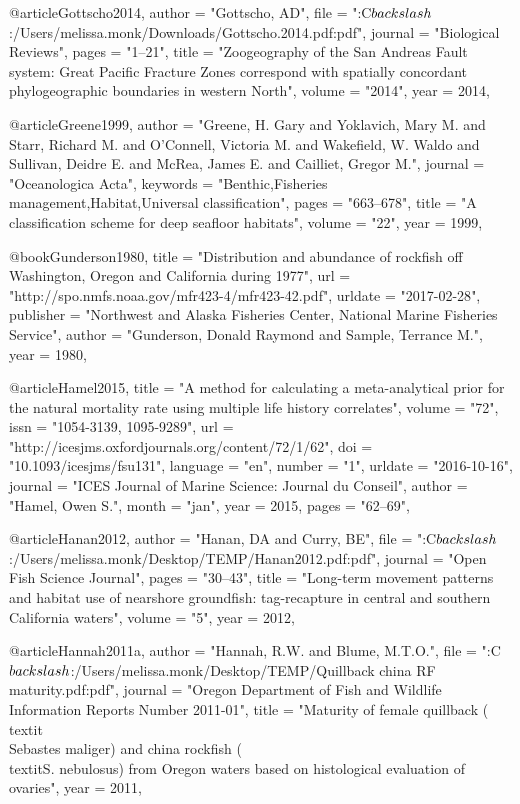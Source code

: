 @article{Gottscho2014,
    author = "{Gottscho, AD}",
    file = "{:C$\\backslash$:/Users/melissa.monk/Downloads/Gottscho.2014.pdf:pdf}",
    journal = "{Biological Reviews}",
    pages = "{1--21}",
    title = "{{Zoogeography of the San Andreas Fault system: Great Pacific Fracture Zones correspond with spatially concordant phylogeographic boundaries in western North}}",
    volume = "{2014}",
    year = 2014,
}

@article{Greene1999,
    author = "{Greene, H. Gary and Yoklavich, Mary M. and Starr, Richard M. and O'Connell, Victoria M. and Wakefield, W. Waldo and Sullivan, Deidre E. and McRea, James E. and Cailliet, Gregor M.}",
    journal = "{Oceanologica Acta}",
    keywords = "{Benthic,Fisheries management,Habitat,Universal classification}",
    pages = "{663--678}",
    title = "{{A classification scheme for deep seafloor habitats}}",
    volume = "{22}",
    year = 1999,
}

@book{Gunderson1980,
    title = "{Distribution and abundance of rockfish off {Washington}, {Oregon} and {California} during 1977}",
    url = "{http://spo.nmfs.noaa.gov/mfr423-4/mfr423-42.pdf}",
    urldate = "{2017-02-28}",
    publisher = "{Northwest and Alaska Fisheries Center, National Marine Fisheries Service}",
    author = "{Gunderson, Donald Raymond and Sample, Terrance M.}",
    year = 1980,
}

@article{Hamel2015,
    title = "{A method for calculating a meta-analytical prior for the natural mortality rate using multiple life history correlates}",
    volume = "{72}",
    issn = "{1054-3139, 1095-9289}",
    url = "{http://icesjms.oxfordjournals.org/content/72/1/62}",
    doi = "{10.1093/icesjms/fsu131}",
    language = "{en}",
    number = "{1}",
    urldate = "{2016-10-16}",
    journal = "{ICES Journal of Marine Science: Journal du Conseil}",
    author = "{Hamel, Owen S.}",
    month = "jan",
    year = 2015,
    pages = "{62--69}",
}

@article{Hanan2012,
    author = "{Hanan, DA and Curry, BE}",
    file = "{:C$\\backslash$:/Users/melissa.monk/Desktop/TEMP/Hanan2012.pdf:pdf}",
    journal = "{Open Fish Science Journal}",
    pages = "{30--43}",
    title = "{{Long-term movement patterns and habitat use of nearshore groundfish: tag-recapture in central and southern California waters}}",
    volume = "{5}",
    year = 2012,
}

@article{Hannah2011a,
    author = "{Hannah, R.W. and Blume, M.T.O.}",
    file = "{:C$\\backslash$:/Users/melissa.monk/Desktop/TEMP/Quillback china RF maturity.pdf:pdf}",
    journal = "{Oregon Department of Fish and Wildlife Information Reports Number 2011-01}",
    title = "{{Maturity of female quillback (\\textit\\{{Sebastes} maliger}) and china rockfish (\\textit{S. nebulosus}) from Oregon waters based on histological evaluation of ovaries}}",
    year = 2011,
}

